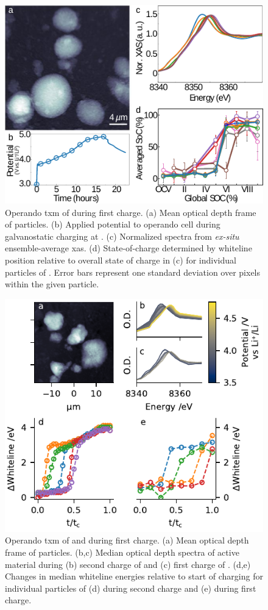 \documentclass{article}
\begin{document}
\begin{figure}
  \includegraphics{figures/nca_txm.pdf}
  \caption{Operando \gls{txm} of \nca{} during first charge. (a) Mean
    optical depth frame of \nca{} particles. (b) Applied potential to
    operando cell during galvanostatic charging at . (c) Normalized spectra from \emph{ex-situ}
    ensemble-average \gls{xas}. (d) State-of-charge determined by
    whiteline position relative to overall state of charge in (c) for
    individual particles of \nca{}. Error bars represent one standard
    deviation over pixels within the given particle.}
  \label{fig:txm-nca}
\end{figure}

\begin{figure}
  \includegraphics{figures/nmc_txm.pdf}
  \caption{Operando \gls{txm} of \nmc[333]{} and \nmc[532]{} during
    first charge. (a) Mean optical depth frame of \nmc[333]{}
    particles. (b,c) Median optical depth spectra of active material
    during (b) second charge of \nmc[333]{} and (c) first charge of
    \nmc[532]{}. (d,e) Changes in median whiteline energies relative
    to start of charging for individual particles of (d) \nmc[333]{}
    during second charge and (e) \nmc[532]{} during first charge.}
  \label{fig:txm-nmc}
\end{figure}
\end{document}
